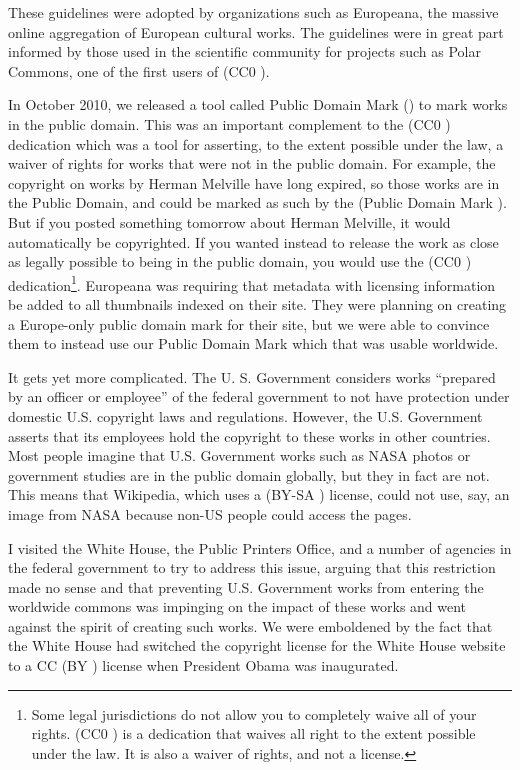 These guidelines were adopted by organizations such as Europeana, the massive online aggregation of European cultural works. The guidelines were in great part informed by those used in the scientific community for projects such as Polar Commons, one of the first users of (CC0 \ccZero).

In October 2010, we released a tool called Public Domain Mark (\ccPublicDomain) to mark works in the public domain. This was an important complement to the (CC0 \ccZero) dedication which was a tool for asserting, to the extent possible under the law, a waiver of rights for works that were not in the public domain. For example, the copyright on works by Herman Melville have long expired, so those works are in the Public Domain, and could be marked as such by the (Public Domain Mark \ccPublicDomain). But if you posted something tomorrow about Herman Melville, it would automatically be copyrighted. If you wanted instead to release the work as close as legally possible to being in the public domain, you would use the (CC0 \ccZero) dedication\footnote{Some legal jurisdictions do not allow you to completely waive all of your rights. (CC0 \ccZero) is a dedication that waives all right to the extent possible under the law. It is also a waiver of rights, and not a license.}. Europeana was requiring that metadata with licensing information be added to all thumbnails indexed on their site. They were planning on creating a Europe-only public domain mark for their site, but we were able to convince them to instead use our Public Domain Mark which that was usable worldwide. 

It gets yet more complicated. The U. S. Government considers works ``prepared by an officer or employee'' of the federal government to not have protection under domestic U.S. copyright laws and regulations. However, the U.S. Government asserts that its employees hold the copyright to these works in other countries. Most people imagine that U.S. Government works such as \ac{NASA} photos or government studies are in the public domain globally, but they in fact are not. This means that Wikipedia, which uses a (BY-SA \ccbysa) license, could not use, say, an image from \ac{NASA} because non-US people could access the pages.

I visited the White House, the Public Printers Office, and a number of agencies in the federal government to try to address this issue, arguing that this restriction made no sense and that preventing U.S. Government works from entering the worldwide commons was impinging on the impact of these works and went against the spirit of creating such works. We were emboldened by the fact that the White House had switched the copyright license for the White House website to a \ac{CC} (BY \ccby) license when President Obama was inaugurated.

